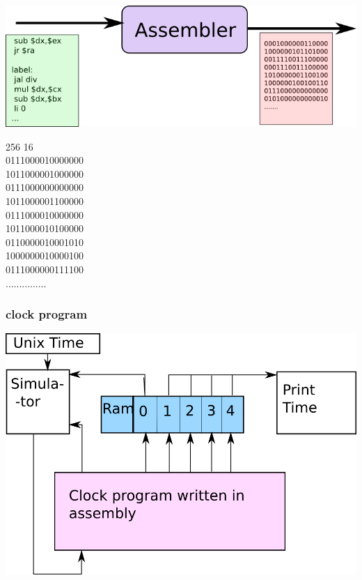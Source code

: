 \documentclass[c]{beamer}
\begin{document}
\begin{frame}
\includegraphics[scale = 0.5]{assembler.png}

\end{frame}

\begin{frame}
256 16 \\
0111000010000000 \\
1011000001000000 \\
0111000000000000 \\
1011000001100000 \\
0111000010000000 \\
1011000010100000 \\
0110000010001010 \\
1000000010000100 \\
0111000000111100 \\
...............
\end{frame}

\begin{frame}
\frametitle{clock program}
\includegraphics[scale = 0.3]{clock.png}
\end{frame}
\end{document}
